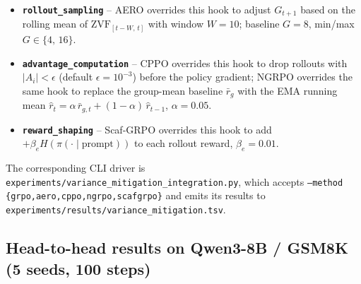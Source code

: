 \begin{itemize}
  \item \textbf{\texttt{rollout\_sampling}} -- AERO overrides this
  hook to adjust \(G_{t+1}\) based on the rolling mean of
  \(\mathrm{ZVF}_{[t-W,\,t]}\) with window \(W{=}10\); baseline
  \(G{=}8\), min/max \(G\in\{4,\,16\}\).
  \item \textbf{\texttt{advantage\_computation}} -- CPPO overrides
  this hook to drop rollouts with \(|A_i|<\epsilon\) (default
  \(\epsilon{=}10^{-3}\)) before the policy gradient;
  NGRPO overrides the same hook to replace the group-mean baseline
  \(\bar r_g\) with the EMA running mean \(\hat r_t =
  \alpha\,\bar r_{g,t}+(1-\alpha)\,\hat r_{t-1}\),
  \(\alpha{=}0.05\).
  \item \textbf{\texttt{reward\_shaping}} -- Scaf-GRPO overrides this
  hook to add \(+\beta_e H(\pi(\cdot\mid \text{prompt}))\) to each
  rollout reward, \(\beta_e{=}0.01\).
\end{itemize}

The corresponding CLI driver is
\texttt{experiments/variance\_mitigation\_integration.py}, which
accepts \texttt{--method \{grpo,aero,cppo,ngrpo,scafgrpo\}} and
emits its results to
\texttt{experiments/results/variance\_mitigation.tsv}.

\subsection{Head-to-head results on Qwen3-8B / GSM8K (5 seeds, 100 steps)}
\label{sec:variance-head2head}

